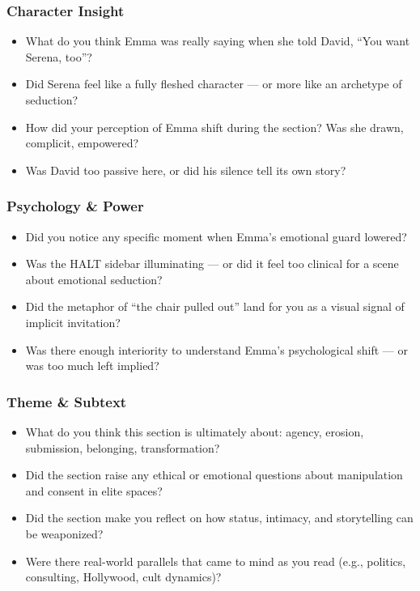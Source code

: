 \subsubsection{Character Insight}

\begin{itemize}
\item What do you think Emma was really saying when she told David, “You want Serena, too”?
\item Did Serena feel like a fully fleshed character — or more like an archetype of seduction?
\item How did your perception of Emma shift during the section? Was she drawn, complicit, empowered?
\item Was David too passive here, or did his silence tell its own story?
\end{itemize}

\subsubsection{Psychology \& Power}

\begin{itemize}
\item Did you notice any specific moment when Emma’s emotional guard lowered?
\item Was the HALT sidebar illuminating — or did it feel too clinical for a scene about emotional seduction?
\item Did the metaphor of “the chair pulled out” land for you as a visual signal of implicit invitation?
\item Was there enough interiority to understand Emma’s psychological shift — or was too much left implied?
\end{itemize}

\subsubsection{Theme \& Subtext}

\begin{itemize}
\item What do you think this section is ultimately about: agency, erosion, submission, belonging, transformation?
\item Did the section raise any ethical or emotional questions about manipulation and consent in elite spaces?
\item Did the section make you reflect on how status, intimacy, and storytelling can be weaponized?
\item Were there real-world parallels that came to mind as you read (e.g., politics, consulting, Hollywood, cult dynamics)?
\end{itemize}

